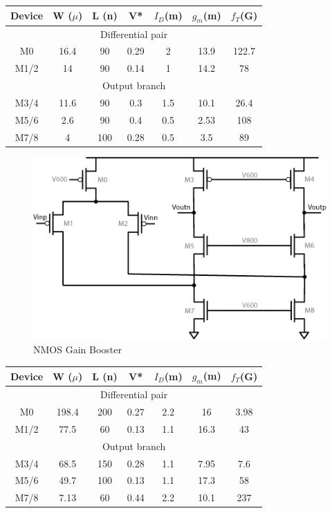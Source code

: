 \documentclass[conference]{IEEEtran}
\begin{document}
\begin{center}
\begin{tabular}{|c|c|c|c|c|c|c|} 
\hline
Device & W ($\mu$) & L (n) & V* & $I_D$(m) & $g_m$(m) & $f_T$(G) \\
\hline
\multicolumn{7}{|c|}{Differential pair} \\
\hline
M0 &	 16.4 & 90 & 0.29 & 2 & 13.9 & 122.7 \\
\hline
M1/2 &  14 & 90 & 0.14 & 1 & 14.2 & 78 \\
\hline
\multicolumn{7}{|c|}{Output branch} \\
\hline
M3/4 & 11.6 & 90 & 0.3 & 1.5 & 10.1 & 26.4 \\
\hline
M5/6 & 2.6 & 90 & 0.4 & 0.5 & 2.53 & 108 \\
\hline
M7/8 & 4 & 100 & 0.28 & 0.5 & 3.5 & 89 \\
\hline
\end{tabular}
\end{center}


\begin{figure}[h]
\centering
\includegraphics[width=0.75\linewidth]{illus/nmos_boost}
\caption{NMOS Gain Booster}
\label{fig:nmos_boost}
\end{figure}

\begin{center}
\begin{tabular}{|c|c|c|c|c|c|c|} 
\hline
Device & W ($\mu$) & L (n) & V* & $I_D$(m) & $g_m$(m) & $f_T$(G) \\
\hline
\multicolumn{7}{|c|}{Differential pair} \\
\hline
M0 &	 198.4 & 200 & 0.27 & 2.2 & 16 & 3.98 \\
\hline
M1/2 &  77.5 & 60 & 0.13 & 1.1 & 16.3 & 43 \\
\hline
\multicolumn{7}{|c|}{Output branch} \\
\hline
M3/4 & 68.5 & 150 & 0.28 & 1.1 & 7.95 & 7.6 \\
\hline
M5/6 & 49.7 & 100 & 0.13 & 1.1 & 17.3 & 58 \\
\hline
M7/8 & 7.13 & 60 & 0.44 & 2.2 & 10.1 & 237 \\
\hline
\end{tabular}
\end{center}
\end{document}
